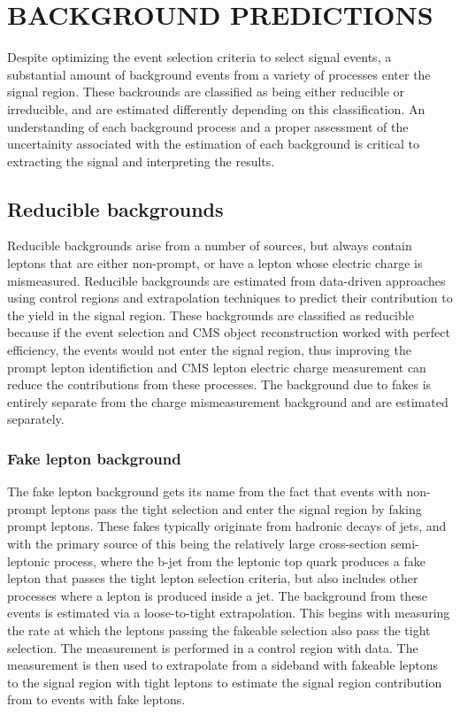 %
%

\chapter{BACKGROUND PREDICTIONS}
\label{chap:background}
Despite optimizing the event selection criteria to select signal events, a substantial amount of background events from a variety of processes enter the signal region.
These backrounds are classified as being either reducible or irreducible, and are estimated differently depending on this classification. An understanding
of each background process and a proper assessment of the uncertainity associated with the estimation of each background is critical to extracting the signal and interpreting
the results. 

\section{Reducible backgrounds}
Reducible backgrounds arise from a number of sources, but always contain leptons that are either non-prompt, or have a lepton whose electric charge is mismeasured.
Reducible backgrounds are estimated from data-driven approaches using control regions and extrapolation techniques to predict their contribution to the yield in the
signal region. 
These backgrounds are classified as reducible because if the event selection and CMS object reconstruction worked with perfect efficiency, the events would not
enter the signal region, thus improving the prompt lepton identifiction and CMS lepton electric charge measurement can reduce the contributions from these processes.
The background due to fakes is entirely separate from the charge mismeasurement background and are estimated separately. 

\subsection{Fake lepton background} 
The fake lepton background gets its name from the fact that events with non-prompt leptons pass the tight selection and enter the signal region by faking prompt leptons. These
fakes typically originate from hadronic decays of jets, and with the primary source of this being the relatively large cross-section semi-leptonic \ttbar
process, where the b-jet from the leptonic top quark produces a fake lepton that passes the tight lepton selection criteria, but also includes other processes where a lepton
is produced inside a jet. The background from these events is estimated via a loose-to-tight extrapolation. This begins with measuring the rate at which the leptons passing
the fakeable selection also pass the tight selection. The measurement is performed in a control region with data.
The measurement is then used to extrapolate from a sideband with fakeable leptons to the signal region with
tight leptons to estimate the signal region contribution from to events with fake leptons. 

